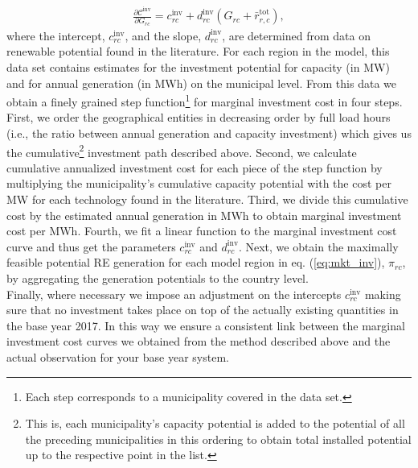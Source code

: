 \documentclass[authoryear]{elsarticle}
\begin{document}
\begin{align}
\frac{\partial\mathcal{C}^\mathrm{inv}}{\partial G_{rc}} = c^\mathrm{inv}_{rc} + d^\mathrm{inv}_{rc} \left(G_{rc}+\bar{r}^\mathrm{tot}_{r,c}\right), \label{eq:marg_inv}
\end{align}
where the intercept, $c^\mathrm{inv}_{rc}$, and the slope, $d^\mathrm{inv}_{rc}$, are determined from data on renewable potential found in the literature\cite{troendle2019,troendle2019a}. For each region in the model, this data set contains estimates for the investment potential for capacity (in MW) and for annual generation (in MWh) on the municipal level. From this data we obtain a finely grained step function\footnote{Each step corresponds to a municipality covered in the data set.} for marginal investment cost in four steps. First, we order the geographical entities in decreasing order by full load hours (i.e., the ratio between annual generation and capacity investment) which gives us the cumulative\footnote{This is, each municipality's capacity potential is added to the potential of all the preceding municipalities in this ordering to obtain total installed potential up to the respective point in the list.} investment path described above. Second, we calculate cumulative annualized investment cost for each piece of the step function by multiplying the municipality's cumulative capacity potential with the cost per MW for each technology found in the literature\cite{ISE2018}. Third, we divide this cumulative cost by the estimated annual generation in MWh to obtain marginal investment cost per MWh. Fourth, we fit a linear function to the marginal investment cost curve and thus get the parameters $c^\mathrm{inv}_{rc}$ and $d^\mathrm{inv}_{rc}$. Next, we obtain the maximally feasible potential RE generation for each model region in eq. (\ref{eq:mkt_inv}), $\pi_{rc}$, by aggregating the generation potentials\cite{troendle2019} to the country level.\\
Finally, where necessary we impose an adjustment on the intercepts $c^\mathrm{inv}_{rc}$ making sure that no investment takes place on top of the actually existing quantities in the base year 2017. In this way we ensure a consistent link between the marginal investment cost curves we obtained from the method described above and the actual observation for your base year system.
\end{document}
